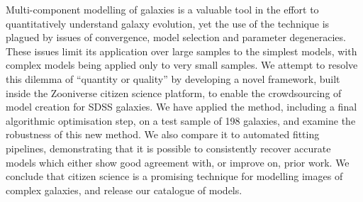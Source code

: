 \documentclass[main\.tex]{subfiles}
\begin{document}
Multi-component modelling of galaxies is a valuable tool in the effort to quantitatively understand galaxy evolution, yet the use of the technique is plagued by issues of convergence, model selection and parameter degeneracies. These issues limit its application over large samples to the simplest models, with complex models being applied only to very small samples. We attempt to resolve this dilemma of ``quantity or quality'' by developing a novel framework, built inside the Zooniverse citizen science platform, to enable the crowdsourcing of model creation for SDSS galaxies. We have applied the method, including a final algorithmic optimisation step, on a test sample of 198 galaxies, and examine the robustness of this new method. We also compare it to automated fitting pipelines, demonstrating that it is possible to consistently recover accurate models which either show good agreement with, or improve on, prior work. We conclude that citizen science is a promising technique for modelling images of complex galaxies, and release our catalogue of models.
\end{document}
